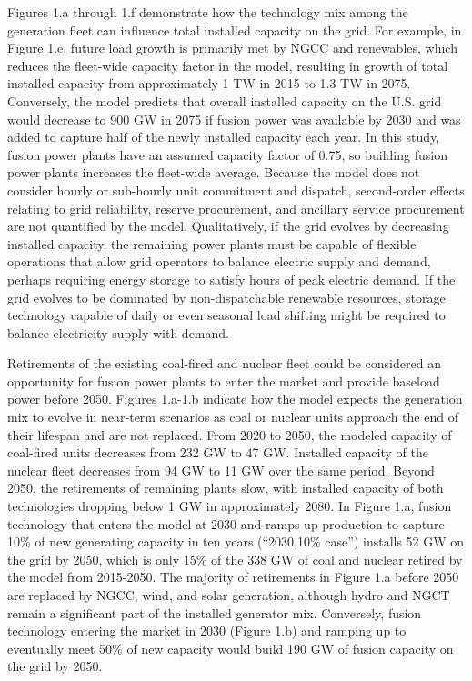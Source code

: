 \documentclass[preprint, 12pt]{elsarticle}
\begin{document}
Figures 1.a through 1.f demonstrate how the technology mix among the generation fleet can influence total installed capacity on the grid. For example, in Figure 1.e, future load growth is primarily met by NGCC and renewables, which reduces the fleet-wide capacity factor in the model, resulting in growth of total installed capacity from approximately 1 TW in 2015 to 1.3 TW in 2075. Conversely, the model predicts that overall installed capacity on the U.S. grid would decrease to 900 GW in 2075 if fusion power was available by 2030 and was added to capture half of the newly installed capacity each year. In this study, fusion power plants have an assumed capacity factor of 0.75, so building fusion power plants increases the fleet-wide average. Because the model does not consider hourly or sub-hourly unit commitment and dispatch, second-order effects relating to grid reliability, reserve procurement, and ancillary service procurement are not quantified by the model. Qualitatively, if the grid evolves by decreasing installed capacity, the remaining power plants must be capable of flexible operations that allow grid operators to balance electric supply and demand, perhaps requiring energy storage to satisfy hours of peak electric demand. If the grid evolves to be dominated by non-dispatchable renewable resources, storage technology capable of daily or even seasonal load shifting might be required to balance electricity supply with demand.

Retirements of the existing coal-fired and nuclear fleet could be considered an opportunity for fusion power plants to enter the market and provide baseload power before 2050. Figures 1.a-1.b indicate how the model expects the generation mix to evolve in near-term scenarios as coal or nuclear units approach the end of their lifespan and are not replaced. From 2020 to 2050, the modeled capacity of coal-fired units decreases from 232 GW to 47 GW. Installed capacity of the nuclear fleet decreases from 94 GW to 11 GW over the same period. Beyond 2050, the retirements of remaining plants slow, with installed capacity of both technologies dropping below 1 GW in approximately 2080. In Figure 1.a, fusion technology that enters the model at 2030 and ramps up production to capture 10\% of new generating capacity in ten years (“2030,10\% case”) installs 52 GW on the grid by 2050, which is only 15\% of the 338 GW of coal and nuclear retired by the model from 2015-2050. The majority of retirements in Figure 1.a before 2050 are replaced by NGCC, wind, and solar generation, although hydro and NGCT remain a significant part of the installed generator mix. Conversely, fusion technology entering the market in 2030 (Figure 1.b) and ramping up to eventually meet 50\% of new capacity would build 190 GW of fusion capacity on the grid by 2050. 
\end{document}
